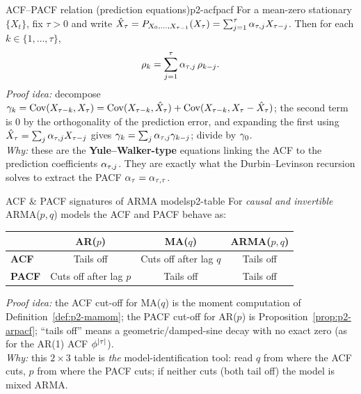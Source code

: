 \begin{proposition}{ACF--PACF relation (prediction equations)}{p2-acfpacf}
For a mean-zero stationary $\{X_t\}$, fix $\tau>0$ and write
$\hat X_\tau=P_{X_0,\dots,X_{\tau-1}}(X_\tau)=\sum_{j=1}^{\tau}\alpha_{\tau,j}X_{\tau-j}$.
Then for each $k\in\{1,\dots,\tau\}$,
\[
\rho_k=\sum_{j=1}^{\tau}\alpha_{\tau,j}\,\rho_{k-j}.
\]
\textit{Proof idea:} decompose
$\gamma_k=\operatorname{Cov}(X_{\tau-k},X_\tau)
=\operatorname{Cov}(X_{\tau-k},\hat X_\tau)+\operatorname{Cov}(X_{\tau-k},X_\tau-\hat X_\tau)$;
the second term is $0$ by the orthogonality of the prediction error, and
expanding the first using $\hat X_\tau=\sum_j\alpha_{\tau,j}X_{\tau-j}$ gives
$\gamma_k=\sum_j\alpha_{\tau,j}\gamma_{k-j}$; divide by $\gamma_0$.\\
\textit{Why:} these are the \textbf{Yule--Walker-type} equations linking the ACF
to the prediction coefficients $\alpha_{\tau,j}$. They are exactly what the
Durbin--Levinson recursion solves to extract the PACF
$\alpha_\tau=\alpha_{\tau,\tau}$.
\end{proposition}

\begin{theorem}{ACF \& PACF signatures of ARMA models}{p2-table}
For \emph{causal and invertible} ARMA($p,q$) models the ACF and PACF behave as:
\begin{center}
\renewcommand{\arraystretch}{1.25}
\begin{tabular}{lccc}
\toprule
 & \textbf{AR($p$)} & \textbf{MA($q$)} & \textbf{ARMA($p,q$)}\\
\midrule
\textbf{ACF}  & Tails off            & Cuts off after lag $q$ & Tails off\\
\textbf{PACF} & Cuts off after lag $p$ & Tails off             & Tails off\\
\bottomrule
\end{tabular}
\end{center}
\textit{Proof idea:} the ACF cut-off for MA($q$) is the moment computation of
Definition~\ref{def:p2-mamom}; the PACF cut-off for AR($p$) is
Proposition~\ref{prop:p2-arpacf}; ``tails off'' means a geometric/damped-sine
decay with no exact zero (as for the AR(1) ACF $\phi^{\left\lvert \tau \right\rvert}$).\\
\textit{Why:} this $2\times3$ table is \emph{the} model-identification tool:
read $q$ from where the ACF cuts, $p$ from where the PACF cuts; if neither cuts
(both tail off) the model is mixed ARMA.
\end{theorem}

